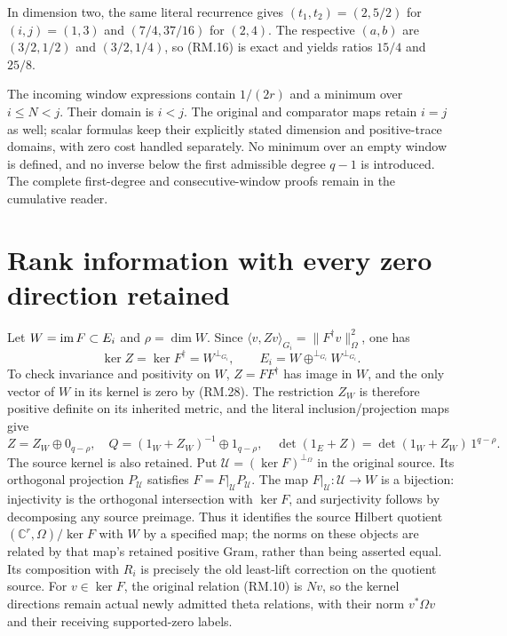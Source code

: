 \documentclass[11pt]{article}
\begin{document}
In dimension two, the same literal recurrence gives $(t_1,t_2)=(2,5/2)$
for $(i,j)=(1,3)$ and $(7/4,37/16)$ for $(2,4)$.
The respective $(a,b)$ are $(3/2,1/2)$ and $(3/2,1/4)$, so (RM.16)
is exact and yields ratios $15/4$ and $25/8$.

The incoming window expressions contain $1/(2r)$ and a minimum over
$i\le N<j$. Their domain is $i<j$. The original and comparator maps
retain $i=j$ as well; scalar formulas keep their explicitly stated dimension
and positive-trace domains, with zero cost handled separately. No minimum
over an empty window is defined, and no
inverse below the first admissible degree $q-1$ is introduced. The complete
first-degree and consecutive-window proofs remain in the cumulative reader.

\section{Rank information with every zero direction retained}
Let $W=\operatorname{im} F\subset E_i$ and $\rho=\dim W$. Since
$\langle v,Zv\rangle_{G_i}=\|F^\dagger v\|_\Omega^2$, one has
\begin{equation}
 \ker Z=\ker F^\dagger=W^{\perp_{G_i}},\qquad
 E_i=W\mathbin{\oplus^{\perp_{G_i}}}W^{\perp_{G_i}}.\tag{RM.28}
\end{equation}
To check invariance and positivity on $W$, $Z=FF^\dagger$ has image in
$W$, and the only vector of $W$ in its kernel is zero by (RM.28).
The restriction $Z_W$ is therefore positive definite on its inherited
metric, and the literal inclusion/projection maps give
\begin{equation}
 Z=Z_W\oplus0_{q-\rho},\quad
 Q=(1_W+Z_W)^{-1}\oplus1_{q-\rho},\quad
 \det(1_E+Z)=\det(1_W+Z_W)\,1^{q-\rho}.\tag{RM.29}
\end{equation}
The source kernel is also retained. Put
$\mathcal U=(\ker F)^{\perp_\Omega}$ in the original source.
Its orthogonal projection $P_{\mathcal U}$ satisfies
$F=F|_{\mathcal U}P_{\mathcal U}$. The map
$F|_{\mathcal U}:\mathcal U\to W$ is a bijection: injectivity is the
orthogonal intersection with $\ker F$, and surjectivity follows by
decomposing any source preimage. Thus it identifies the source Hilbert
quotient $(\mathbb C^r,\Omega)/\ker F$ with $W$ by a specified map;
the norms on these objects are related by that map's retained positive
Gram, rather than being asserted equal. Its composition with $R_i$
is precisely the old least-lift correction on the quotient source.
For $v\in\ker F$, the original relation (RM.10) is $Nv$, so the kernel
directions remain actual newly admitted theta relations, with their norm
$v^*\Omega v$ and their receiving supported-zero labels.
\end{document}
